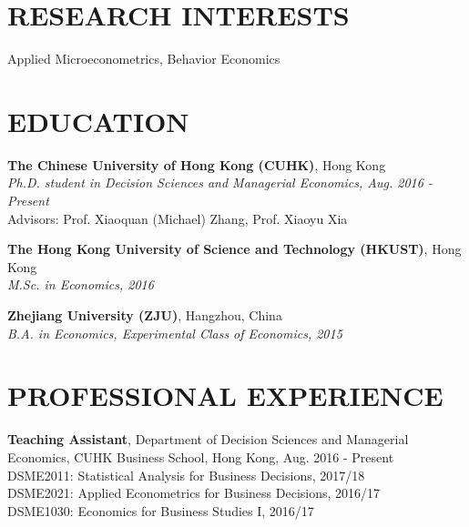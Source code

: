 \documentclass{res} 			%
\begin{document}
 
\thispagestyle{empty} %
\address{ \vspace{0.2in} \\
  Room 940, Cheng Yu Tung Building, \\
  No. 12 Chak Cheung Street,\\
  Shatin, N.T., Hong Kong SAR} 
\address{ \vspace{0.2in} \\
  Tel: +852 3943 9296 \\
  Email: zhangdonglei@link.cuhk.edu.hk \\
  http://dongleizhang.com \\}

\begin{resume} 
\vspace{0.1in}

\section{RESEARCH INTERESTS}
\vspace{0.1in}
	Applied Microeconometrics, Behavior Economics


\section{EDUCATION}
\vspace{0.1in} 
    {\bf The Chinese University of Hong Kong (CUHK)}, Hong Kong \\
    {\sl Ph.D. student in Decision Sciences and Managerial Economics, Aug. 2016 - Present} \\
    Advisors: Prof. Xiaoquan (Michael) Zhang, Prof. Xiaoyu Xia
    
    {\bf The Hong Kong University of Science and Technology (HKUST)}, Hong Kong \\
    {\sl M.Sc. in Economics, 2016} 

    {\bf Zhejiang University (ZJU)}, Hangzhou, China \\
    {\sl B.A. in Economics, Experimental Class of Economics, 2015}


\section{PROFESSIONAL EXPERIENCE} 
\vspace{0.1in} 
    {\bf Teaching Assistant}, 
    Department of Decision Sciences and Managerial Economics,
    CUHK Business School, Hong Kong,
    Aug. 2016 - Present \\
    DSME2011: Statistical Analysis for Business Decisions, 2017/18 \\
    DSME2021: Applied Econometrics for Business Decisions, 2016/17 \\
    DSME1030: Economics for Business Studies I, 2016/17
    

\end{resume}
\end{document}

